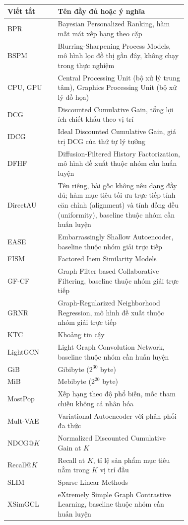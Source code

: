 \documentclass[12pt,a4paper]{article}
\theoremstyle{plain} %
\theoremstyle{plain} %
\theoremstyle{plain} %
\theoremstyle{nonumberplain}  %
\numberwithin{equation}{section}
\numberwithin{figure}{section}
\numberwithin{table}{section}
\begin{document}
\begin{longtable}{@{}l>{\raggedright\arraybackslash}p{0.72\linewidth}@{}}
\toprule
Viết tắt & Tên đầy đủ hoặc ý nghĩa \\
\midrule
\endhead
BPR & Bayesian Personalized Ranking, hàm mất mát xếp hạng theo cặp \\
BSPM & Blurring-Sharpening Process Models, mô hình lọc đồ thị gần đây, không chạy trong thực nghiệm \\
CPU, GPU & Central Processing Unit (bộ xử lý trung tâm), Graphics Processing Unit (bộ xử lý đồ họa) \\
DCG & Discounted Cumulative Gain, tổng lợi ích chiết khấu theo vị trí \\
IDCG & Ideal Discounted Cumulative Gain, giá trị DCG của thứ tự lý tưởng \\
DFHF & Diffusion-Filtered History Factorization, mô hình đề xuất thuộc nhóm cần huấn luyện \\
DirectAU & Tên riêng, bài gốc không nêu dạng đầy đủ; hàm mục tiêu tối ưu trực tiếp tính căn chỉnh (alignment) và tính đồng đều (uniformity), baseline thuộc nhóm cần huấn luyện \\
EASE & Embarrassingly Shallow Autoencoder, baseline thuộc nhóm giải trực tiếp \\
FISM & Factored Item Similarity Models \\
GF-CF & Graph Filter based Collaborative Filtering, baseline thuộc nhóm giải trực tiếp \\
GRNR & Graph-Regularized Neighborhood Regression, mô hình đề xuất thuộc nhóm giải trực tiếp \\
KTC & Khoảng tin cậy \\
LightGCN & Light Graph Convolution Network, baseline thuộc nhóm cần huấn luyện \\
GiB & Gibibyte ($2^{30}$ byte) \\
MiB & Mebibyte ($2^{20}$ byte) \\
MostPop & Xếp hạng theo độ phổ biến, mốc tham chiếu không cá nhân hóa \\
Mult-VAE & Variational Autoencoder với phân phối đa thức \\
NDCG@$K$ & Normalized Discounted Cumulative Gain at $K$ \\
Recall@$K$ & Recall at $K$, tỉ lệ sản phẩm mục tiêu nằm trong $K$ vị trí đầu \\
SLIM & Sparse Linear Methods \\
XSimGCL & eXtremely Simple Graph Contrastive Learning, baseline thuộc nhóm cần huấn luyện \\
\bottomrule
\end{longtable}
\endgroup
\end{document}
